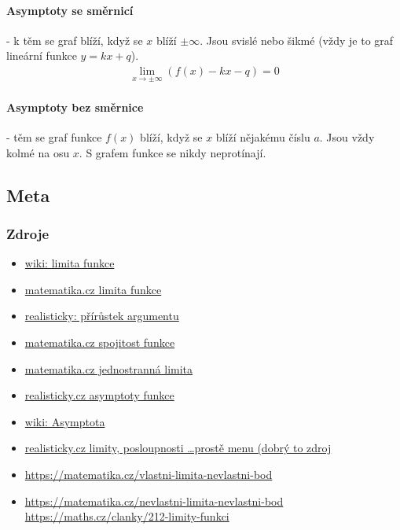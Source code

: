 \documentclass[12pt]{article}
\begin{document}
\paragraph{Asymptoty se směrnicí} - k těm se graf blíží, když se $x$ blíží $\pm \infty$.  Jsou svislé nebo šikmé (vždy je to graf lineární funkce $y =kx +q$).
\begin{align}
\lim \limits _{x\rightarrow \pm \infty }(f(x)-kx-q)=0
\end{align}
\paragraph{Asymptoty bez směrnice} - těm se graf funkce $f(x)$ blíží, když se $x$ blíží nějakému číslu $a$. Jsou vždy kolmé na osu $x$. S grafem funkce se nikdy neprotínají.
\subsection{Meta}
\subsubsection{Zdroje}
\begin{itemize}
\item \href{https://cs.wikipedia.org/wiki/Limita_funkce}{wiki: limita funkce}
\item \href{https://matematika.cz/limita-funkce}{matematika.cz limita funkce}
\item \href{http://www.realisticky.cz/hodina.php?id=1174}{realisticky: přírůstek argumentu}
\item \href{https://matematika.cz/spojitost-funkce}{matematika.cz spojitost funkce}
\item \href{https://matematika.cz/jednostranna-limita}{matematika.cz jednostranná limita}
\item \href{http://www.realisticky.cz/ucebnice/01\%20Matematika\%20S\%C5\%A0/10\%20Diferenci\%C3\%A1ln\%C3\%AD\%20a\%20integr\%C3\%A1ln\%C3\%AD\%20po\%C4\%8Det/01\%20Spojitost,\%20limita/13\%20Asymptoty\%20grafu\%20funkce.pdf}{realisticky.cz asymptoty funkce}
\item \href{https://cs.wikipedia.org/wiki/Asymptota}{wiki: Asymptota}
\item \href{http://www.realisticky.cz/kapitola.php?id=104}{realisticky.cz limity, posloupnosti \dots prostě menu (dobrý to zdroj}
\item \url{https://matematika.cz/vlastni-limita-nevlastni-bod}
\item \url{https://matematika.cz/nevlastni-limita-nevlastni-bod}
\url{https://maths.cz/clanky/212-limity-funkci}
\end{itemize}
\end{document}
